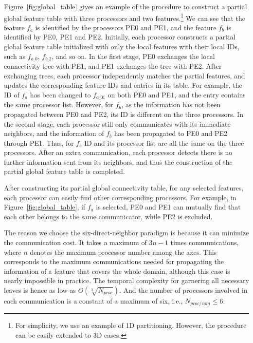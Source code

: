 Figure~\ref{fig:global_table} gives an example of the procedure to construct a partial global feature table with three processors and two features.\footnote{For simplicity, we use an example of 1D partitioning. However, the procedure can be easily extended to 3D cases.} We can see that the feature $f_a$ is identified by the processors PE0 and PE1, and the feature $f_b$ is identified by PE0, PE1 and PE2. Initially, each processor constructs a partial global feature table initialized with only the local features with their local IDs, such as $f_{a\_0}$, $f_{b\_2}$, and so on. In the first stage, PE0 exchanges the local connectivity tree with PE1, and PE1 exchanges the tree with PE2. After exchanging trees, each processor independently matches the partial features, and updates the corresponding feature IDs and entries in its table. For example, the ID of $f_a$ has been changed to $f_{a\_01}$ on both PE0 and PE1, and the entry contains the same processor list. However, for $f_b$, as the information has not been propagated between PE0 and PE2, its ID is different on the three processors. In the second stage, each processor still only communicates with its immediate neighbors, and the information of $f_b$ has been propagated to PE0 and PE2 through PE1. Thus, for $f_b$ ID and its processor list are all the same on the three processors. After an extra communication, each processor detects there is no further information sent from its neighbors, and thus the construction of the partial global feature table is completed.

After constructing its partial global connectivity table, for any selected features, each processor can easily find other corresponding processors. For example, in Figure~\ref{fig:global_table}, if $f_a$ is selected, PE0 and PE1 can mutually find that each other belongs to the same communicator, while PE2 is excluded.

The reason we choose the six-direct-neighbor paradigm is because it can minimize the communication cost. It takes a maximum of ${3n-1}$ times communications, where $n$ denotes the maximum processor number among the axes. This corresponds to the maximum communications needed for propagating the information of a feature that covers the whole domain, although this case is nearly impossible in practice. The temporal complexity for garnering all necessary leaves is hence as low as ${O(\sqrt[3]{N_{proc}})}$. And the number of processors involved in each communication is a constant of a maximum of six, i.e., $N_{proc/com} \leq 6$.

